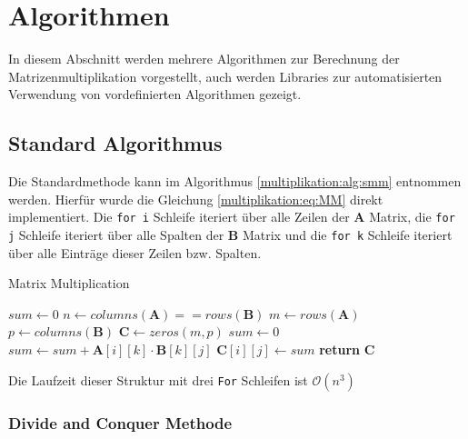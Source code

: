 %
%
%

\section{Algorithmen}

In diesem Abschnitt werden mehrere Algorithmen zur Berechnung der Matrizenmultiplikation vorgestellt, auch werden Libraries zur automatisierten Verwendung von vordefinierten Algorithmen gezeigt.

\subsection{Standard Algorithmus}

Die Standardmethode kann im Algorithmus \ref{multiplikation:alg:smm} entnommen werden.
Hierf\"ur wurde die Gleichung \eqref{multiplikation:eq:MM} direkt implementiert.
Die \texttt{for i} Schleife iteriert \"uber alle Zeilen der $\mathbf{A}$ Matrix, die \texttt{for j} Schleife iteriert \"uber alle Spalten der $\mathbf{B}$ Matrix und die \texttt{for k} Schleife iteriert \"uber alle Eintr\"age dieser Zeilen bzw. Spalten.

\begin{algorithm}\caption{Matrix Multiplication}
	\label{multiplikation:alg:smm}
	\setlength{\lineskip}{7pt}
	\begin{algorithmic}[1]
		\State $sum \gets 0$
		\State $n \gets columns(\textbf{A}) == rows(\textbf{B})$
		\State $m \gets rows(\textbf{A})$
		\State $p \gets columns(\textbf{B})$
		\State $\textbf{C} \gets zeros(m,p)$
		\State $sum \gets 0$
		\State $sum \gets  sum + \textbf{A}[i][k] \cdot \textbf{B}[k][j]$
		\EndFor
		\State $\textbf{C}[i][j] \gets  sum $
		\EndFor
		\EndFor
		\State \textbf{return} $\textbf{C}$
		\EndFunction
	\end{algorithmic}
\end{algorithm}

Die Laufzeit dieser Struktur mit drei \texttt{For} Schleifen ist $\mathcal{O}\left(n^3\right)$

\subsubsection{Divide and Conquer Methode}

